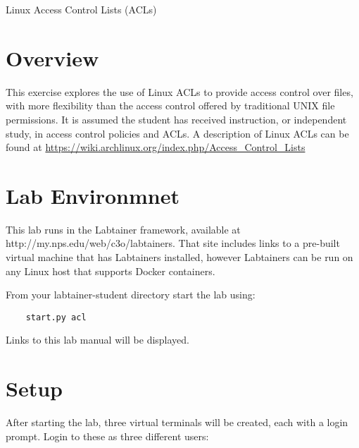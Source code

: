 


\begin{center}
{\LARGE Linux Access Control Lists (ACLs)}
\vspace{0.1in}\\
\end{center}

\copyrightnotice

\section{Overview}
This exercise explores the use of Linux ACLs to provide
access control over files, with more flexibility than 
the access control offered by traditional UNIX file permissions.
It is assumed the student has received instruction, or independent
study, in access control policies and ACLs.  A description of
Linux ACLs can be found at 
\url {https://wiki.archlinux.org/index.php/Access\_Control\_Lists}

\section{Lab Environmnet}
This lab runs in the Labtainer framework,
available at http://my.nps.edu/web/c3o/labtainers.
That site includes links to a pre-built virtual machine
that has Labtainers installed, however Labtainers can
be run on any Linux host that supports Docker containers.

From your labtainer-student directory start the lab using:
\begin{verbatim}
    start.py acl
\end{verbatim}
Links to this lab manual will be displayed.  

\section{Setup}
After starting the lab, three virtual terminals will be created, each with a login
prompt.  Login to these as three different users:

